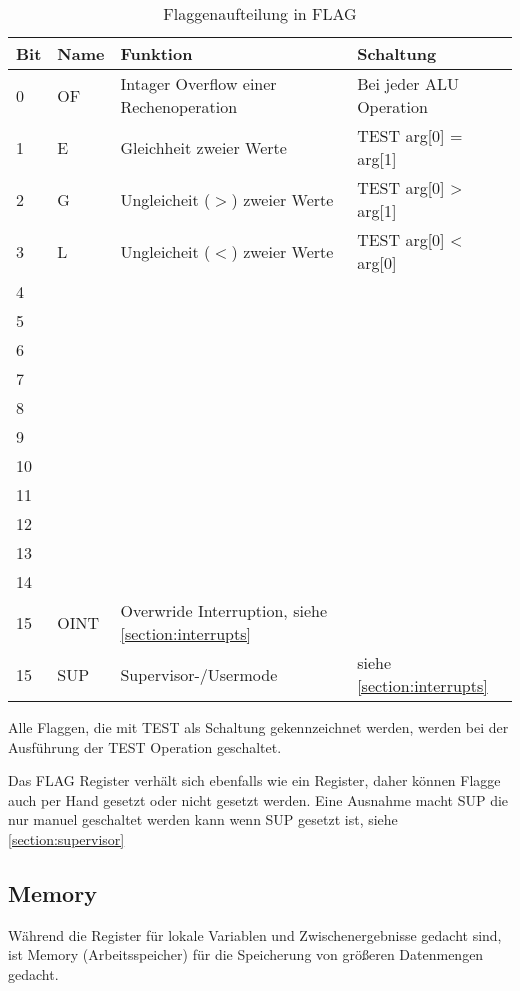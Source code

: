 \documentclass{scrartcl}
\begin{document}
\begin{center}
	\begin{table}[h]
		\caption{\label{table:flag}Flaggenaufteilung in FLAG}
		\begin{tabular}{l | l | l | l}
			Bit & Name & Funktion & Schaltung \\
			\hline
			 0 & OF  & Intager Overflow einer Rechenoperation & Bei jeder ALU Operation\\
			 1 & E   & Gleichheit zweier Werte & TEST arg[0] = arg[1]\\
			 2 & G   & Ungleicheit ($>$) zweier Werte & TEST arg[0] > arg[1]\\
			 3 & L   & Ungleicheit ($<$) zweier Werte & TEST arg[0] < arg[0]\\
			 4 &  &  &  \\
			 5 &  &  &  \\
			 6 &  &  &  \\
			 7 &  &  &  \\
			 8 &  &  &  \\
			 9 &  &  &  \\
			10 &  &  &  \\
			11 &  &  &  \\
			12 &  &  &  \\
			13 &  &  &  \\
			14 &  &  &  \\
			15 & OINT & Overwride Interruption, siehe \autoref{section:interrupts} &  \\
			15 & SUP & Supervisor-/Usermode & siehe \autoref{section:interrupts} 
		\end{tabular}
	\end{table}
\end{center}


Alle Flaggen, die mit TEST als Schaltung gekennzeichnet werden, werden bei der Ausführung der TEST Operation geschaltet.

Das FLAG Register verhält sich ebenfalls wie ein Register, daher können Flagge auch per Hand gesetzt oder nicht gesetzt werden. Eine Ausnahme macht SUP die nur manuel geschaltet werden kann wenn SUP gesetzt ist, siehe \autoref{section:supervisor}




\subsection{\label{section:memory}Memory}

Während die Register für lokale Variablen und Zwischenergebnisse gedacht sind, ist Memory (Arbeitsspeicher) für die Speicherung von größeren Datenmengen gedacht.
\end{document}
